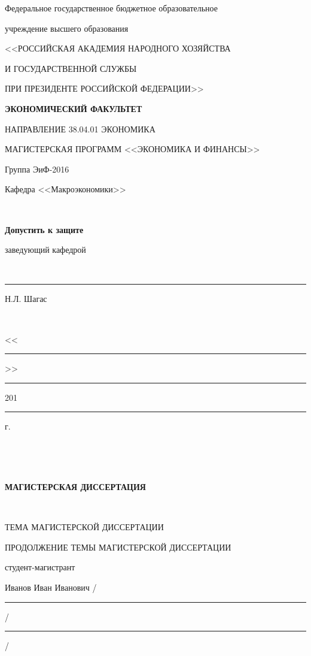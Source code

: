\documentclass[14pt,a4paper, oneside]{extreport}
\begin{document}
\pagestyle{fancy}

\thispagestyle{empty}

\renewcommand{\headrulewidth}{0pt}
\begin{center}
\small Федеральное государственное бюджетное образовательное 

учреждение высшего образования \vspace{2ex}

 
<<РОССИЙСКАЯ АКАДЕМИЯ НАРОДНОГО ХОЗЯЙСТВА 

И ГОСУДАРСТВЕННОЙ СЛУЖБЫ 

ПРИ ПРЕЗИДЕНТЕ РОССИЙСКОЙ
ФЕДЕРАЦИИ>>

\vspace{2ex}

\bfseries
ЭКОНОМИЧЕСКИЙ ФАКУЛЬТЕТ

НАПРАВЛЕНИЕ 38.04.01 ЭКОНОМИКА

МАГИСТЕРСКАЯ ПРОГРАММ <<ЭКОНОМИКА И ФИНАНСЫ>>
\end{center}

\vfill


\noindent\small Группа ЭиФ-2016
\hfill
\parbox[t]{20em}{\centering\small
Кафедра <<Макроэкономики>>

\mbox{ }

\textbf{Допустить к защите}

заведующий кафедрой

\mbox{ }

\rule{8em}{0.5pt} Н.Л. Шагас

\mbox{ }

<<\rule{2em}{0.5pt}>> \rule{5em}{0.5pt} 201\rule{1em}{0.5pt} г. }

\mbox{ }

\mbox{ }

\begin{center}\bfseries
МАГИСТЕРСКАЯ ДИССЕРТАЦИЯ

\mbox{ }

\large
ТЕМА МАГИСТЕРСКОЙ ДИССЕРТАЦИИ 

ПРОДОЛЖЕНИЕ ТЕМЫ МАГИСТЕРСКОЙ ДИССЕРТАЦИИ 

\end{center}

\vfill

\noindent\normalsize
студент-магистрант

\noindent
Иванов Иван Иванович 
\hfill /\rule{6em}{0.5pt}/\rule{6em}{0.5pt}/

\hfill{}
\end{document}
